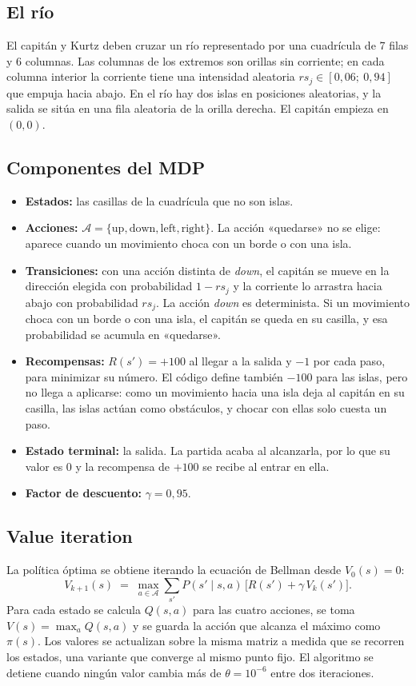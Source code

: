 \documentclass[11pt,a4paper]{article}
\begin{document}
\subsection{El río}
El capitán y Kurtz deben cruzar un río representado por una cuadrícula de 7 filas y 6 columnas. Las columnas de los extremos son orillas sin corriente; en cada columna interior la corriente tiene una intensidad aleatoria $rs_j\in[0{,}06;\ 0{,}94]$ que empuja hacia abajo. En el río hay dos islas en posiciones aleatorias, y la salida se sitúa en una fila aleatoria de la orilla derecha. El capitán empieza en $(0,0)$.

\subsection{Componentes del MDP}
\begin{itemize}
\item \textbf{Estados:} las casillas de la cuadrícula que no son islas.
\item \textbf{Acciones:} $\mathcal{A}=\{\text{up}, \text{down}, \text{left}, \text{right}\}$. La acción «quedarse» no se elige: aparece cuando un movimiento choca con un borde o con una isla.
\item \textbf{Transiciones:} con una acción distinta de \emph{down}, el capitán se mueve en la dirección elegida con probabilidad $1-rs_j$ y la corriente lo arrastra hacia abajo con probabilidad $rs_j$. La acción \emph{down} es determinista. Si un movimiento choca con un borde o con una isla, el capitán se queda en su casilla, y esa probabilidad se acumula en «quedarse».
\item \textbf{Recompensas:} $R(s')=+100$ al llegar a la salida y $-1$ por cada paso, para minimizar su número. El código define también $-100$ para las islas, pero no llega a aplicarse: como un movimiento hacia una isla deja al capitán en su casilla, las islas actúan como obstáculos, y chocar con ellas solo cuesta un paso.
\item \textbf{Estado terminal:} la salida. La partida acaba al alcanzarla, por lo que su valor es 0 y la recompensa de $+100$ se recibe al entrar en ella.
\item \textbf{Factor de descuento:} $\gamma=0{,}95$.
\end{itemize}

\subsection{Value iteration}
La política óptima se obtiene iterando la ecuación de Bellman desde $V_0(s)=0$:
\begin{equation}
V_{k+1}(s) \;=\; \max_{a\in\mathcal{A}} \sum_{s'} P(s'\mid s,a)\,\bigl[R(s')+\gamma\,V_k(s')\bigr].
\end{equation}
Para cada estado se calcula $Q(s,a)$ para las cuatro acciones, se toma $V(s)=\max_a Q(s,a)$ y se guarda la acción que alcanza el máximo como $\pi(s)$. Los valores se actualizan sobre la misma matriz a medida que se recorren los estados, una variante que converge al mismo punto fijo. El algoritmo se detiene cuando ningún valor cambia más de $\theta=10^{-6}$ entre dos iteraciones.
\end{document}

